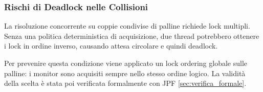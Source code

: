\subsubsection*{Rischi di Deadlock nelle Collisioni}
La risoluzione concorrente su coppie condivise di palline richiede lock multipli. Senza una politica deterministica di acquisizione, due thread potrebbero ottenere i lock in ordine inverso, causando attesa circolare e quindi deadlock.

Per prevenire questa condizione viene applicato un lock ordering globale sulle palline: i monitor sono acquisiti sempre nello stesso ordine logico. La validità della scelta è stata poi verificata formalmente con JPF \ref{sec:verifica_formale}.